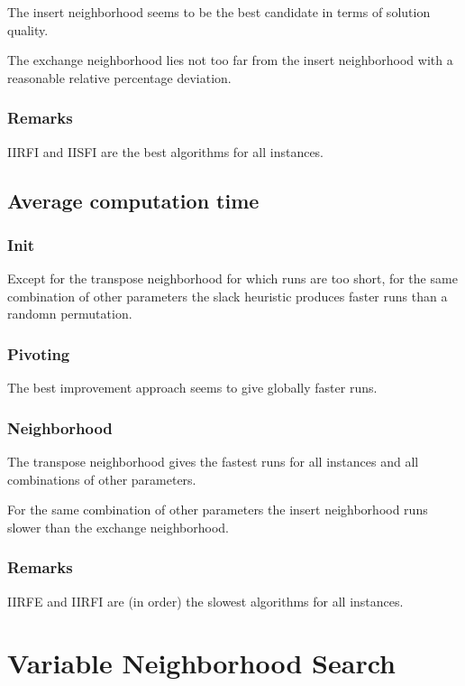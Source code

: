 \documentclass[a4paper,12pt]{article}
\begin{document}
The insert neighborhood seems to be the best candidate in terms of solution quality.

The exchange neighborhood lies not too far from the insert neighborhood with a reasonable relative percentage deviation.



\subsubsection{Remarks}

IIRFI and IISFI are the best algorithms for all instances.
\subsection{Average computation time}


\subsubsection{Init}

Except for the transpose neighborhood for which runs are too short, for the same combination of other parameters the slack heuristic produces faster runs than a randomn permutation.

\subsubsection{Pivoting}

The best improvement approach seems to give globally faster runs.

\subsubsection{Neighborhood}

The transpose neighborhood gives the fastest runs for all instances and all combinations of other parameters.

For the same combination of other parameters the insert neighborhood runs slower than the exchange neighborhood.


\subsubsection{Remarks}

IIRFE and IIRFI are (in order) the slowest algorithms for all instances.

\newpage\cleardoublepage{}
\section{Variable Neighborhood Search}
\end{document}
